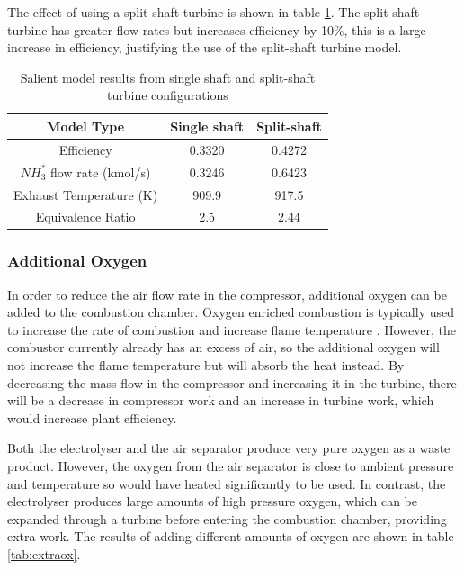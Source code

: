 \documentclass[11pt, oneside]{article}
\begin{document}
The effect of using a split-shaft turbine is shown in table \ref{tab:splitshaft}. The split-shaft turbine has greater flow rates but increases efficiency by 10\%, this is a large increase in efficiency, justifying the use of the split-shaft turbine model. 

\begin {table} [h]
\begin{center}
\caption{Salient model results from single shaft and split-shaft turbine configurations} \label{tab:splitshaft} 
\begin{tabular}{ |c|c|c| }
 \hline
  Model Type & Single shaft & Split-shaft\\ 
 \hline
  Efficiency & 0.3320 & 0.4272 \\ 
  \hline
  $NH_3^*$ flow rate (kmol/s) & 0.3246 & 0.6423\\ 
 \hline
  Exhaust Temperature (K) & 909.9 & 917.5\\
  \hline
  Equivalence Ratio & 2.5 & 2.44\\
 \hline
\end{tabular}
\end{center}  
\end {table} %

\subsubsection{Additional Oxygen}
In order to reduce the air flow rate in the compressor, additional oxygen can be added to the combustion chamber. Oxygen enriched combustion is typically used to increase the rate of combustion and increase flame temperature \cite{oxyfuel}. However, the combustor currently already has an excess of air, so the additional oxygen will not increase the flame temperature but will absorb the heat instead. By decreasing the mass flow in the compressor and increasing it in the turbine, there will be a decrease in compressor work and an increase in turbine work, which would increase plant efficiency. 

Both the electrolyser and the air separator produce very pure oxygen as a waste product. However, the oxygen from the air separator is close to ambient pressure and temperature so would have heated significantly to be used. In contrast, the electrolyser produces large amounts of high pressure oxygen, which can be expanded through a turbine before entering the combustion chamber, providing extra work. The results of adding different amounts of oxygen are shown in table \ref{tab:extraox}.
\end{document}
